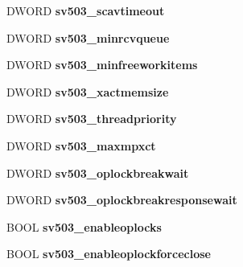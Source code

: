 \begin{DoxyCompactItemize}
D\+W\+O\+RD {\bfseries sv503\+\_\+scavtimeout}
\item 
\mbox{\label{struct___s_e_r_v_e_r___i_n_f_o__503_a4032b9093ef7cafc34036335be98fba5}} 
D\+W\+O\+RD {\bfseries sv503\+\_\+minrcvqueue}
\item 
\mbox{\label{struct___s_e_r_v_e_r___i_n_f_o__503_a599f007b360d6368820366196bb80bc3}} 
D\+W\+O\+RD {\bfseries sv503\+\_\+minfreeworkitems}
\item 
\mbox{\label{struct___s_e_r_v_e_r___i_n_f_o__503_ae13d899c714781d8d7833fefe9ad286c}} 
D\+W\+O\+RD {\bfseries sv503\+\_\+xactmemsize}
\item 
\mbox{\label{struct___s_e_r_v_e_r___i_n_f_o__503_a4c279de615411f8db7716f6691446c10}} 
D\+W\+O\+RD {\bfseries sv503\+\_\+threadpriority}
\item 
\mbox{\label{struct___s_e_r_v_e_r___i_n_f_o__503_ab4ddf538a3e797bfd441de9e53b26a1b}} 
D\+W\+O\+RD {\bfseries sv503\+\_\+maxmpxct}
\item 
\mbox{\label{struct___s_e_r_v_e_r___i_n_f_o__503_aef365badedc60900d02c96c56252e9a7}} 
D\+W\+O\+RD {\bfseries sv503\+\_\+oplockbreakwait}
\item 
\mbox{\label{struct___s_e_r_v_e_r___i_n_f_o__503_ac7d8a2f4d60ec2dbe6145a8f8d03cdf7}} 
D\+W\+O\+RD {\bfseries sv503\+\_\+oplockbreakresponsewait}
\item 
\mbox{\label{struct___s_e_r_v_e_r___i_n_f_o__503_a8b63661ff40e3e2af5b3843fffe0e1fc}} 
B\+O\+OL {\bfseries sv503\+\_\+enableoplocks}
\item 
\mbox{\label{struct___s_e_r_v_e_r___i_n_f_o__503_a0c6163a31ca166be18bc767e8cdd1e0f}} 
B\+O\+OL {\bfseries sv503\+\_\+enableoplockforceclose}
\item 
\mbox{\label{struct___s_e_r_v_e_r___i_n_f_o__503_a678752821eafa728023a991f833c1756}} 

\end{DoxyCompactItemize}
